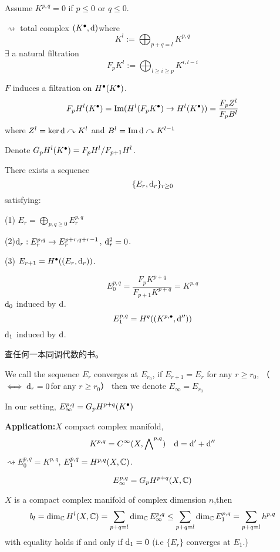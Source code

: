 Assume $K^{p,q}=0$ if $p\leq 0$ or $q\leq 0$.

$\rightsquigarrow$ total complex $(K^{\bullet},\mathrm{d})$where
$$K^l:=\bigoplus_{p+q=l}K^{p,q}$$
$\exists$ a natural filtration
$$F_pK^l:=\bigoplus_{l\geq i\geq p}K^{i,l-i}$$

$F$ induces a filtration on $H^{\bullet}(K^{\bullet})$.
$$F_pH^l(K^{\bullet})=\operatorname{Im}(H^l(F_pK^{\bullet})\to H^l(K^{\bullet}))
=\frac{F_p Z^l}{F_p B^l}$$
where $Z^l=\ker \mathrm{d}\curvearrowright K^l$ and $B^l=\operatorname{Im}\mathrm{d}\curvearrowright K^{l-1}$

Denote $G_pH^l(K^{\bullet})=F_pH^l/F_{p+1}H^l$.

\begin{thm}There exists a sequence
$$\{E_r,\mathrm{d}_r\}_{r\geq 0}$$
satisfying:

(1) $E_r=\bigoplus\limits_{p,q\geq 0}E_r^{p,q}$

(2)$\mathrm{d}_r:E_r^{p,q}\to E_r^{p+r,q+r-1}$, $\mathrm{d}_r^2=0$.

(3) $E_{r+1}=H^{\bullet}((E_r,\mathrm{d}_r))$.

\end{thm}

$$E_0^{p,q}=\frac{F_p K^{p+q}}{F_{p+1}K^{p+q}}=K^{p,q}$$
$\mathrm{d}_0$ induced by $\mathrm{d}$.
$$E_1^{p,q}=H^q((K^{p,\bullet},\mathrm{d}''))$$
$\mathrm{d}_1$ induced by $\mathrm{d}$.

查任何一本同调代数的书。

\begin{definition}
We call the sequence ${E_r}$ converges at $E_{r_0}$,
if $E_{r+1}=E_r$ for any $r\geq r_0$,
（$\iff\mathrm{d}_r=0$for any $r\geq r_0$）
then we denote $E_\infty=E_{r_0}$
\end{definition}

In our setting, $E_\infty^{p,q}=G_pH^{p+q}(K^{\bullet})$

\textbf{Application:}$X$ compact complex manifold,
$$K^{p,q}=C^\infty(X,\bigwedge\nolimits^{p,q})\quad \mathrm{d}=\mathrm{d}'+\mathrm{d}''$$
$\rightsquigarrow E_0^{p,q}=K^{p,q}$,
$E_1^{p,q}=H^{p,q}(X,\mathbb{C})$.

\begin{cor}
$$E^{p,q}_\infty=G_pH^{p+q}(X,\mathbb{C})$$
\end{cor}

\begin{thm}
$X$ is a compact complex manifold of complex dimension $n$,then
$$b_l=\dim_{\mathbb{C}}H^l(X,\mathbb{C})=\sum_{p+q=l}\dim_{\mathbb{C}}E_\infty^{p,q}\leq
\sum_{p+q=l}\dim_{\mathbb{C}}E_1^{p,q}=\sum_{p+q=l}h^{p,q}$$
with equality holds if and only if $\mathrm{d}_1=0$
(i.e $\{E_r\}$ converges at $E_1$.)
\end{thm}

